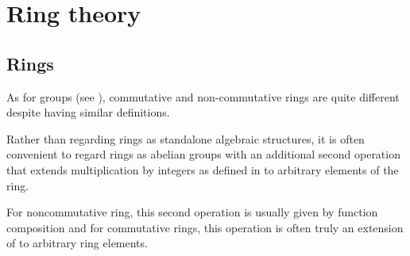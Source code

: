 \section{Ring theory}\label{sec:ring_theory}
\subsection{Rings}\label{subsec:rings}

\begin{remark}\label{remark:rings}
  As for groups (see ), commutative and non-commutative rings are quite different despite having similar definitions.

  Rather than regarding rings as standalone algebraic structures, it is often convenient to regard rings as abelian groups with an additional second operation that extends multiplication by integers as defined in  to arbitrary elements of the ring.

  For noncommutative ring, this second operation is usually given by function composition and for commutative rings, this operation is often truly an extension of  to arbitrary ring elements.
\end{remark}


